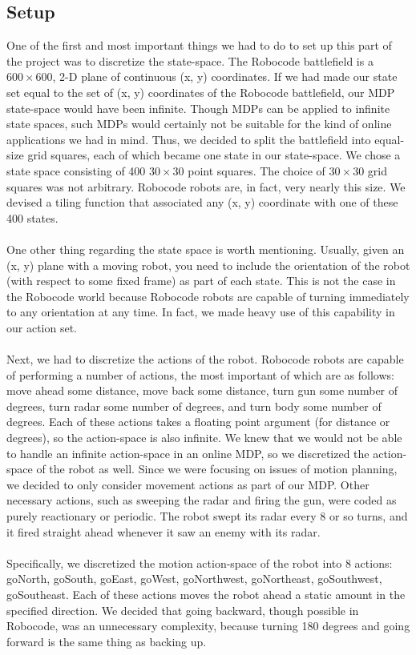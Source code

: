 \documentclass{aiaa-tc}%
\begin{document}
\subsection{Setup}
One of the first and most important things we had to do to set up this part of the project was to discretize the state-space. The Robocode battlefield is a $600 \times 600$, 2-D plane of continuous (x, y) coordinates. If we had made our state set equal to the set of (x, y) coordinates of the Robocode battlefield, our MDP state-space would have been infinite. Though MDPs can be applied to infinite state spaces, such MDPs would certainly not be suitable for the kind of online applications we had in mind. Thus, we decided to split the battlefield into equal-size grid squares, each of which became one state in our state-space. We chose a state space consisting of 400 $30 \times 30$ point squares. The choice of $30 \times 30$ grid squares was not arbitrary. Robocode robots are, in fact, very nearly this size. We devised a tiling function that associated any (x, y) coordinate with one of these 400 states. \\ \\
One other thing regarding the state space is worth mentioning. Usually, given an (x, y) plane with a moving robot, you need to include the orientation of the robot (with respect to some fixed frame) as part of each state. This is not the case in the Robocode world because Robocode robots are capable of turning immediately to any orientation at any time. In fact, we made heavy use of this capability in our action set. \\ \\
Next, we had to discretize the actions of the robot. Robocode robots are capable of performing a number of actions, the most important of which are as follows: move ahead some distance, move back some distance, turn gun some number of degrees, turn radar some number of degrees, and 
turn body some number of degrees. Each of these actions takes a floating point argument (for distance or degrees), so the action-space is also infinite. We knew that we would not be able to handle an infinite action-space in an online MDP, so we discretized the  action-space of the robot
as well. Since we were focusing on issues of motion planning, we decided to only consider movement actions as part of our MDP. Other necessary actions, such as sweeping the radar and firing the gun, were coded as purely reactionary or periodic. The robot swept its radar every 8 or so turns, and it fired straight ahead whenever it saw an enemy with its radar. \\ \\
Specifically, we discretized the motion action-space of the robot into 8 actions: goNorth, goSouth, goEast, goWest, goNorthwest, goNortheast, goSouthwest, goSoutheast. Each of these actions moves the robot ahead a static amount in the specified direction. We decided that going backward, though possible in Robocode, was an unnecessary complexity, because turning 180 degrees and going forward is the same thing as backing up.
\end{document}
